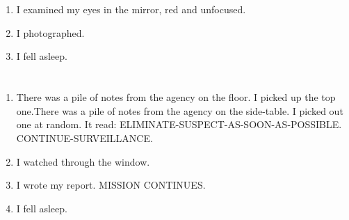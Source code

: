 \documentclass{article}
\begin{document}
    \newpage
    
    \section{}
    
    \begin{enumerate}
    
    \item I examined my eyes in the mirror, red and unfocused.\\
    
    \item I photographed.\\
    
    \item I fell asleep.\\
    
    \end{enumerate}
     
    \newpage
    
    \section{}
    
    \begin{enumerate}
    
    \item There was a pile of notes from the agency on the floor. I picked up the top one.There was a pile of notes from the agency on the side-table. I picked out one at random. It read: ELIMINATE-SUSPECT-AS-SOON-AS-POSSIBLE. CONTINUE-SURVEILLANCE.\\
    
    \item I watched through the window.\\
    
    \item I wrote my report. MISSION CONTINUES.\\
    
    \item I fell asleep.\\
    
    \end{enumerate}
     
    \newpage
    
    \section{}
    
\end{document}
